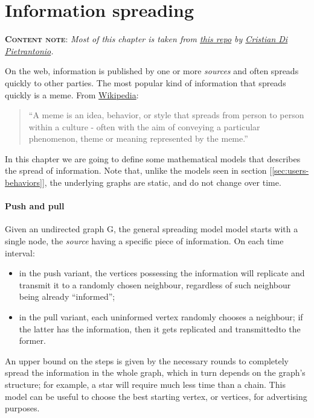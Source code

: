\chapter[Information spreading]{Information spreading}

\textbf{\textsc{Content note}}: \emph{Most of this chapter is taken from \href{https://github.com/Halolegend94/uni_social_behavioral_networks/blob/master/chapters/ch01-meme-flow.tex}{this repo} by \href{https://github.com/Halolegend94}{Cristian Di Pietrantonio}.}
\vspace{2ex}

On the web, information is published by one or more \emph{sources} and often spreads quickly to other parties. The most popular kind of information that spreads quickly is a meme. From \href{https://en.wikipedia.org/wiki/Meme}{Wikipedia}:

\begin{quote}
	``A meme is an idea, behavior, or style that spreads from person to person within a culture - often with the aim of conveying a particular phenomenon, theme or meaning represented by the meme.''
\end{quote}

In this chapter we are going to define some mathematical models that describes the spread of information. Note that, unlike  the models seen in section [\ref{sec:users-behaviors}], the underlying graphs are static, and do not change over time.

\subsubsection{Push and pull}

Given an undirected graph G, the general spreading model model starts with a single node, the \emph{source} having a specific piece of information. On each time interval:
\begin{itemize}
    \item in the push variant, the vertices possessing the information will replicate and transmit it to a randomly chosen neighbour, regardless of such neighbour being already ``informed'';
    \item in the pull variant, each uninformed vertex randomly chooses a neighbour; if the latter has the information, then it gets replicated and transmittedto the former.
\end{itemize}

An upper bound on the steps is given by the necessary rounds to completely spread the information in the whole graph, which in turn depends on the graph's structure; for example, a star will require much less time than a chain. This model can be useful to choose the best starting vertex, or vertices, for advertising purposes.

